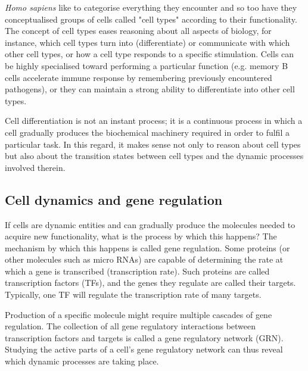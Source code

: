 \textit{Homo sapiens} like to categorise everything they encounter and so too have they conceptualised groups of cells called "cell types" according to their functionality. The concept of cell types eases reasoning about all aspects of biology, for instance, which cell types turn into (differentiate) or communicate with which other cell types, or how a cell type responds to a specific stimulation. Cells can be highly specialised toward performing a particular function (e.g. memory B cells accelerate immune response by remembering previously encountered pathogens), or they can maintain a strong ability to differentiate into other cell types. 

Cell differentiation is not an instant process; it is a continuous process in which a cell gradually produces the biochemical machinery required in order to fulfil a particular task. In this regard, it makes sense not only to reason about cell types but also about the transition states between cell types and the dynamic processes involved therein.


\subsection{Cell dynamics and gene regulation}
If cells are dynamic entities and can gradually produce the molecules needed to acquire new functionality, what is the process by which this happens? The mechanism by which this happens is called gene regulation. Some proteins (or other molecules such as micro RNAs) are capable of determining the rate at which a gene is transcribed (transcription rate). Such proteins are called transcription factors (TFs), and the genes they regulate are called their targets. Typically, one TF will regulate the transcription rate of many targets.


Production of a specific molecule might require multiple cascades of gene regulation. The collection of all gene regulatory interactions between transcription factors and targets is called a gene regulatory network (GRN). Studying the active parts of a cell's gene regulatory network can thus reveal which dynamic processes are taking place. 

